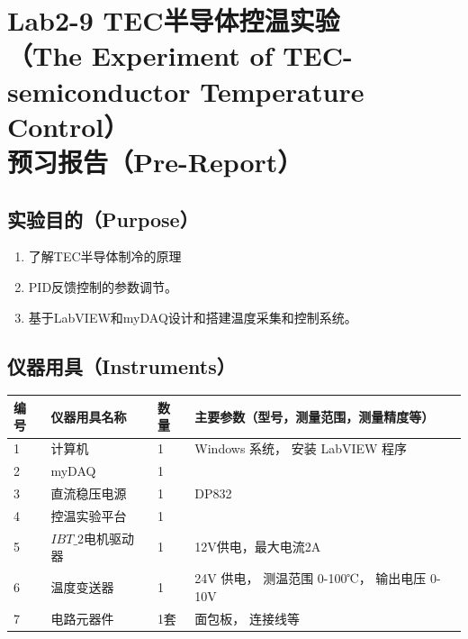 \documentclass[dvipsnames, svgnames,a4paper,11pt]{article}
\begin{document}
	
	
	\clearpage
	\tableofcontents
	\clearpage
	
	
	
	
	\setcounter{section}{0}
	\section{Lab2-9 TEC半导体控温实验\\（The Experiment of TEC-semiconductor Temperature Control）\\ \quad\heiti 预习报告（Pre-Report）}
	
	\subsection{实验目的（Purpose）}
	\begin{enumerate}
		\item 了解TEC半导体制冷的原理
		\item PID反馈控制的参数调节。
		\item 基于LabVIEW和myDAQ设计和搭建温度采集和控制系统。
		
		
	\end{enumerate}
	
	\subsection{仪器用具（Instruments）}
	\begin{table}[htbp]
		\centering
		\renewcommand\arraystretch{1.6}
		\begin{tabular}{p{}|p{}|p{}|p{}}
			\hline
			编号& 仪器用具名称 			& 数量 		&  主要参数（型号，测量范围，测量精度等） \\
			\hline
			1	&	计算机 				&1 			& Windows 系统， 安装 LabVIEW 程序\\
			
			2	&	myDAQ 				&1 			& 		 \\
			
			3	&	直流稳压电源 		& 1 		&	DP832 \\
			
			4	&	控温实验平台		&1 			&   \\
			
			5	&	$IBT\_2$电机驱动器	&	1 		& 12V供电，最大电流2A \\
			
			6	&	温度变送器			&	1 		&		24V 供电， 测温范围 0-100℃， 输出电压 0-10V \\
			
			7	&	电路元器件			&	1套 	& 面包板， 连接线等 \\
			\hline
		\end{tabular}
	\end{table}
	
\end{document}
